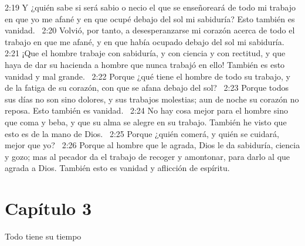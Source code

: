 2:19 Y ¿quién sabe si será sabio o necio el que se enseñoreará de todo mi trabajo en que yo me afané y en que ocupé debajo del sol mi sabiduría? Esto también es vanidad.  
2:20 Volvió, por tanto, a desesperanzarse mi corazón acerca de todo el trabajo en que me afané, y en que había ocupado debajo del sol mi sabiduría.  
2:21 ¡Que el hombre trabaje con sabiduría, y con ciencia y con rectitud, y que haya de dar su hacienda a hombre que nunca trabajó en ello! También es esto vanidad y mal grande.  
2:22 Porque ¿qué tiene el hombre de todo su trabajo, y de la fatiga de su corazón, con que se afana debajo del sol?  
2:23 Porque todos sus días no son sino dolores, y sus trabajos molestias; aun de noche su corazón no reposa. Esto también es vanidad.  
2:24 No hay cosa mejor para el hombre sino que coma y beba, y que su alma se alegre en su trabajo. También he visto que esto es de la mano de Dios.  
2:25 Porque ¿quién comerá, y quién se cuidará, mejor que yo?  
2:26 Porque al hombre que le agrada, Dios le da sabiduría, ciencia y gozo; mas al pecador da el trabajo de recoger y amontonar, para darlo al que agrada a Dios. También esto es vanidad y aflicción de espíritu.  
\section*{Capítulo 3}
Todo tiene su tiempo  

